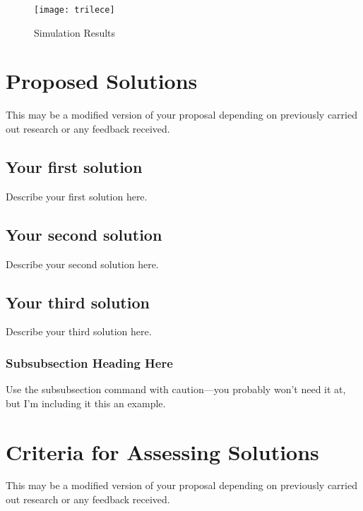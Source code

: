 \documentclass[peerreview]{IEEEtran}
\begin{document}
%
%
\begin{figure}[!h]
\centering
\texttt{[image: trilece]} 
\caption{Simulation Results}
\label{fig_sim}
\end{figure}


\section{Proposed Solutions}
This may be a modified version of your proposal depending on previously carried out research or any feedback received.  
\subsection{Your first solution}
Describe your first solution here.
\subsection{Your second solution}
Describe your second solution here.
\subsection{Your third solution}
Describe your third solution here.
\subsubsection{Subsubsection Heading Here}
Use the subsubsection command with caution---you probably won't need it at, but I'm including it this an example.

\section{Criteria for Assessing Solutions} \label{sec:criteria}
This may be a modified version of your proposal depending on previously carried out research or any feedback received.  
\end{document}

